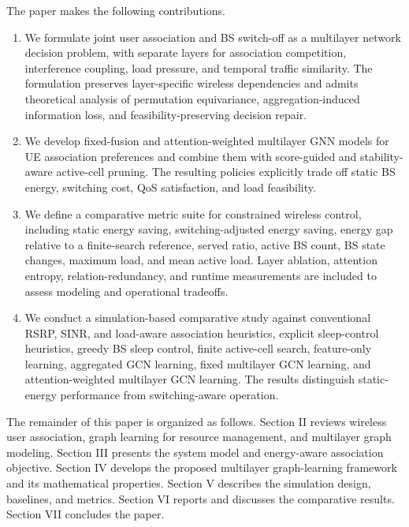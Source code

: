 \documentclass[journal]{IEEEtran}
\begin{document}
The paper makes the following contributions.
\begin{enumerate}
    \item We formulate joint user association and BS switch-off as a multilayer
    network decision problem, with separate layers for association competition,
    interference coupling, load pressure, and temporal traffic similarity.
    The formulation preserves layer-specific wireless dependencies and admits
    theoretical analysis of permutation equivariance, aggregation-induced
    information loss, and feasibility-preserving decision repair.

    \item We develop fixed-fusion and attention-weighted multilayer GNN models
    for UE association preferences and combine them with score-guided and
    stability-aware active-cell pruning. The resulting policies explicitly
    trade off static BS energy, switching cost, QoS satisfaction, and load
    feasibility.

    \item We define a comparative metric suite for constrained wireless
    control, including static energy saving, switching-adjusted energy saving,
    energy gap relative to a finite-search reference, served ratio, active BS
    count, BS state changes, maximum load, and mean active load. Layer
    ablation, attention entropy, relation-redundancy, and runtime measurements
    are included to assess modeling and operational tradeoffs.

    \item We conduct a simulation-based comparative study against conventional
    RSRP, SINR, and load-aware association heuristics, explicit sleep-control
    heuristics, greedy BS sleep control, finite active-cell search,
    feature-only learning, aggregated GCN learning, fixed multilayer GCN
    learning, and attention-weighted multilayer GCN learning. The results
    distinguish static-energy performance from switching-aware operation.
\end{enumerate}

The remainder of this paper is organized as follows. Section II reviews
wireless user association, graph learning for resource management, and
multilayer graph modeling. Section III presents the system model and
energy-aware association objective. Section IV develops the proposed multilayer
graph-learning framework and its mathematical properties. Section V describes
the simulation design, baselines, and metrics. Section VI reports and discusses
the comparative results. Section VII concludes the paper.
\end{document}
